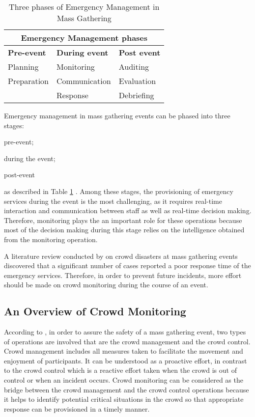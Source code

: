 \begin{table}[!htbp]
	\caption{Three phases of Emergency Management in Mass Gathering}
	\label{table:phaseOfEm}
	\centering
	\begin{tabular}{|p{3cm}|p{3cm}|p{3cm}|}
		\hline
		\multicolumn{3}{|c|}{\textbf{Emergency Management phases}} \\ \hline \hline
		\textbf{Pre-event} & \textbf{During event} & \textbf{Post event} \\	\hline
		Planning & Monitoring  & Auditing  \\
		Preparation & Communication & Evaluation \\
		& Response & Debriefing \\
		\hline
	\end{tabular}
\end{table}

Emergency management in mass gathering events can be phased into three stages: 
\begin{inparaenum}[i)]
	\item pre-event;
	\item during the event;
	\item post-event
\end{inparaenum} as described in Table \ref{table:phaseOfEm} \parencite{DelirHaghighi2013}. Among these stages, the provisioning of emergency services during the event is the most challenging, as it requires real-time interaction and communication between staff as well as real-time decision making. Therefore, monitoring plays the an important role for these operations because most of the decision making during this stage relies on the intelligence obtained from the monitoring operation. 

A literature review conducted by \textcite{Soomaroo2012} on crowd disasters at mass gathering events discovered that a significant number of cases reported a poor response time of the emergency services. Therefore, in order to prevent future incidents, more effort should be made on crowd monitoring during the course of an event. 

\subsection{An Overview of Crowd Monitoring}

According to \textcite{Berlonghi1995}, in order to assure the safety of a mass gathering event, two types of operations are involved that are the crowd management and the crowd control. Crowd management includes all measures taken to facilitate the movement and enjoyment of participants. It can be understood as a proactive effort, in contrast to the crowd control which is a reactive effort taken when the crowd is out of control or when an incident occurs. Crowd monitoring can be considered as the bridge between the crowd management and the crowd control operations because it helps to identify potential critical situations in the crowd so that appropriate response can be provisioned in a timely manner.


